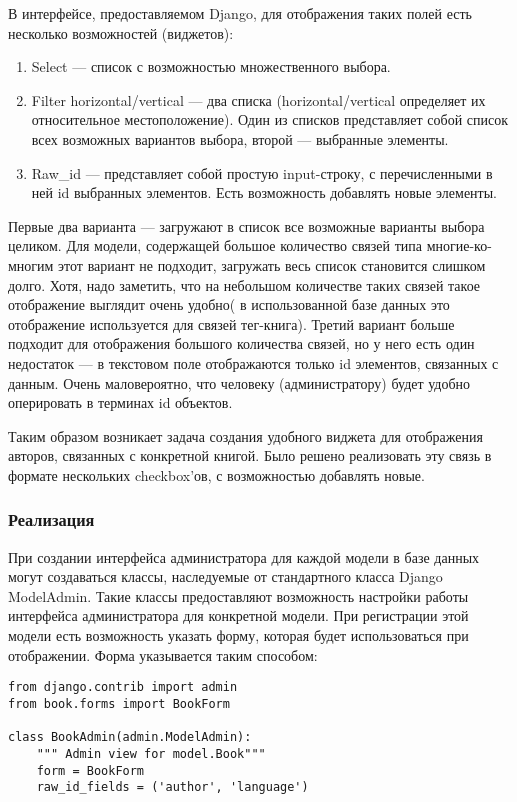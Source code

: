 В интерфейсе, предоставляемом Django, для отображения таких полей есть несколько возможностей (виджетов):
\begin{enumerate}
	\item Select --- список с возможностью множественного выбора.
	\item Filter horizontal/vertical --- два списка (horizontal/vertical определяет их относительное местоположение). Один из списков представляет собой список всех возможных вариантов выбора, второй --- выбранные элементы.
	\item Raw\_id --- представляет собой простую input-строку, с перечисленными в ней id выбранных элементов. Есть возможность добавлять новые элементы.
\end{enumerate}
Первые два варианта --- загружают в список все возможные варианты выбора целиком. Для модели, содержащей большое количество связей типа многие-ко-многим этот вариант не подходит, \tk загружать весь список становится слишком долго. Хотя, надо заметить, что на небольшом количестве таких связей такое отображение выглядит очень удобно( в использованной базе данных это отображение используется для связей тег-книга). 
Третий вариант больше подходит для отображения большого количества связей, но у него есть один недостаток --- в текстовом поле отображаются только id элементов, связанных с данным. Очень маловероятно, что человеку (администратору) будет удобно оперировать в терминах id объектов.

Таким образом возникает задача создания удобного виджета для отображения авторов, связанных с конкретной книгой.
Было решено реализовать эту связь в формате нескольких checkbox'ов, с возможностью добавлять
новые.

\subsubsection{Реализация}

При создании интерфейса администратора для каждой модели в базе данных могут создаваться классы, наследуемые от стандартного класса Django ModelAdmin. Такие классы предоставляют возможность настройки работы интерфейса администратора для конкретной модели. При регистрации этой модели есть возможность указать форму, которая будет использоваться при отображении. Форма указывается таким способом:

{
\small \begin{verbatim}
from django.contrib import admin
from book.forms import BookForm

class BookAdmin(admin.ModelAdmin):
    """ Admin view for model.Book"""
    form = BookForm
    raw_id_fields = ('author', 'language')
\end{verbatim}
}

